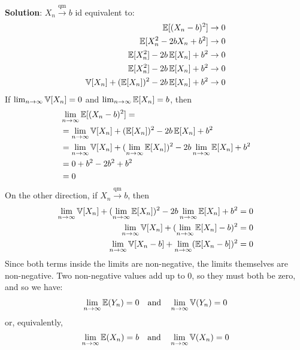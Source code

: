 \textbf{Solution}:
\(X_{n} \xrightarrow{\text{qm}} b\) id equivalent to:
\begin{align*}
\operatorname{\mathbb{E}}[(X_{n} - b)^{2}]           & \rightarrow 0 \\
\operatorname{\mathbb{E}}[X_{n}^{2} - 2b X_{n} + b^{2}]  & \rightarrow 0 \\
\operatorname{\mathbb{E}}[X_{n}^{2}] - 2b \operatorname{\mathbb{E}}[X_{n}] + b^{2} & \rightarrow 0 \\
\operatorname{\mathbb{E}}[X_{n}^{2}] - 2b \operatorname{\mathbb{E}}[X_{n}] + b^{2} & \rightarrow 0 \\
\operatorname{\mathbb{V}}[X_{n}] + (\operatorname{\mathbb{E}}[X_{n}])^{2} - 2b \operatorname{\mathbb{E}}[X_{n}] + b^{2}  & \rightarrow 0
\end{align*}
If \(\lim_{n \rightarrow \infty} \operatorname{\mathbb{V}}[X_{n}] = 0\) and
\(\lim_{n \rightarrow \infty} \operatorname{\mathbb{E}}[X_{n}] = b\), then
\begin{align*}
& \lim_{n \rightarrow \infty} \operatorname{\mathbb{E}}[(X_{n} - b)^{2}] = \\
& = \lim_{n \rightarrow \infty} \operatorname{\mathbb{V}}[X_{n}] + (\operatorname{\mathbb{E}}[X_{n}])^{2} - 2b \operatorname{\mathbb{E}}[X_{n}] + b^{2} \\
& = \lim_{n \rightarrow \infty} \operatorname{\mathbb{V}}[X_{n}] + (\lim_{n \rightarrow \infty} \operatorname{\mathbb{E}}[X_{n}])^{2} - 2b \lim_{n \rightarrow \infty} \operatorname{\mathbb{E}}[X_{n}] + b^{2} \\
&= 0 + b^{2} - 2b^{2} + b^{2} \\
&= 0
\end{align*}
On the other direction, if \(X_{n} \xrightarrow{\text{qm}} b\), then
\begin{align*}
\lim_{n \rightarrow \infty} \operatorname{\mathbb{V}}[X_{n}] + (\lim_{n \rightarrow \infty} \operatorname{\mathbb{E}}[X_{n}])^{2} - 2b \lim_{n \rightarrow \infty} \operatorname{\mathbb{E}}[X_{n}] + b^{2} &= 0 \\
\lim_{n \rightarrow \infty} \operatorname{\mathbb{V}}[X_{n}] + (\lim_{n \rightarrow \infty} \operatorname{\mathbb{E}}[X_{n}] - b)^{2} &= 0 \\
\lim_{n \rightarrow \infty} \operatorname{\mathbb{V}}[X_{n} - b] + \lim_{n \rightarrow \infty}  (\operatorname{\mathbb{E}}[X_{n} - b])^{2} &= 0
\end{align*}
Since both terms inside the limits are non-negative, the limits
themselves are non-negative. Two non-negative values add up to 0, so
they must both be zero, and so we have:
\begin{align*}\lim_{n \rightarrow \infty} \operatorname{\mathbb{E}}(Y_{n}) = 0
\quad\mathrm{and}\quad 
\lim_{n \rightarrow \infty} \operatorname{\mathbb{V}}(Y_{n}) = 0
\end{align*}
or, equivalently,
\begin{align*}\lim_{n \rightarrow \infty} \operatorname{\mathbb{E}}(X_{n}) = b
\quad\mathrm{and}\quad 
\lim_{n \rightarrow \infty} \operatorname{\mathbb{V}}(X_{n}) = 0
\end{align*}

